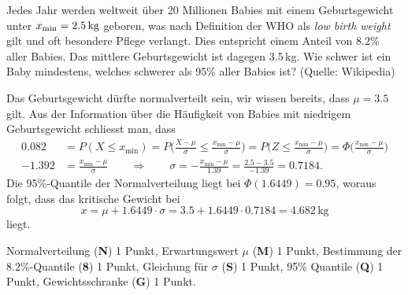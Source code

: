Jedes Jahr werden weltweit über 20 Millionen Babies mit einem
Geburtsgewicht unter $x_{\text{min}}=\text{2.5\,kg}$ geboren,
was nach Definition der WHO als {\em low birth weight} gilt und
oft besondere Pflege verlangt.
Dies entspricht einem Anteil von 8.2\% aller Babies.
Das mittlere Geburtsgewicht ist dagegen 3.5\,kg.
Wie schwer ist ein Baby mindestens, welches schwerer als 95\% aller
Babies ist?
(Quelle: Wikipedia)

\begin{loesung}
Das Geburtsgewicht dürfte normalverteilt sein, wir wissen bereits, dass
$\mu=3.5$ gilt.
Aus der Information über die Häufigkeit von Babies mit niedrigem
Geburtsgewicht schliesst man, dass
\begin{align*}
0.082
&=
P(X\le x_{\text{min}})
=
P\biggl(
\frac{X-\mu}{\sigma} \le \frac{x_{\text{min}} - \mu}{\sigma}
\biggr)
=
P\biggl(
Z \le \frac{x_{\text{min}}-\mu}{\sigma}
\biggr)
=
\Phi\biggl(
\frac{x_{\text{min}}-\mu}{\sigma}
\biggr)
\\
-1.392
&=
\frac{x_{\text{min}}-\mu}{\sigma}
\qquad\Rightarrow\qquad
\sigma
=
-
\frac{x_{\text{min}}-\mu}{1.39}
=
\frac{2.5-3.5}{-1.39}
=
0.7184.
\end{align*}
Die 95\%-Quantile der Normalverteilung liegt bei $\Phi(1.6449)=0.95$,
woraus folgt, dass das kritische Gewicht bei
\[
x
=
\mu + 1.6449\cdot\sigma
=
3.5 + 1.6449\cdot 0.7184
=
4.682\,\text{kg}
\]
liegt.
\end{loesung}

\begin{bewertung}
Normalverteilung ({\bf N}) 1 Punkt,
Erwartungswert $\mu$ ({\bf M}) 1 Punkt,
Bestimmung der 8.2\%-Quantile ({\bf 8}) 1 Punkt,
Gleichung für $\sigma$ ({\bf S}) 1 Punkt,
95\% Quantile ({\bf Q}) 1 Punkt,
Gewichtsschranke ({\bf G}) 1 Punkt.
\end{bewertung}

